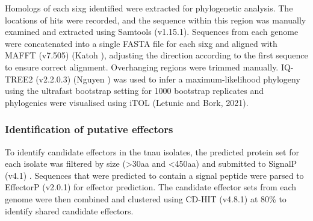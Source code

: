 Homologs of each \ac{sixg} identified were extracted for phylogenetic analysis.  The locations of hits were recorded, and the sequence within this region was manually examined and extracted using Samtools (v1.15.1). Sequences from each genome were concatenated into a single FASTA file for each \ac{sixg} and aligned with  MAFFT (v7.505) (Katoh ), adjusting the direction according to the first sequence to ensure correct alignment. Overhanging regions were trimmed manually. IQ-TREE2 (v2.2.0.3) (Nguyen ) was used to infer a maximum-likelihood phylogeny using the ultrafast bootstrap setting for 1000 bootstrap replicates and phylogenies were visualised using iTOL (Letunic and Bork, 2021). 

\subsubsection{Identification of putative effectors}

To identify candidate effectors in the \ac{tnau} isolates, the predicted protein set for each isolate was filtered by size (>30aa and <450aa) and submitted to SignalP (v4.1) \parencite{Petersen2011}. Sequences that were predicted to contain a signal peptide were parsed to EffectorP (v2.0.1) \parencite{Sperschneider2018} for effector prediction. The candidate effector sets from each genome were then combined and clustered using CD-HIT (v4.8.1) at 80\% to identify shared candidate effectors. 



